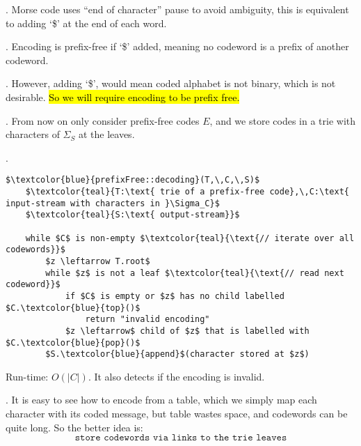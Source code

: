 \documentclass{article}
\begin{document}
\begin{examplee}[].
    Morse code uses ``end of character'' pause to avoid ambiguity, this is equivalent to adding `\$' at the end of each word. 
    \begin{result}[].
        Encoding is prefix-free if `\$' added, meaning no codeword is a prefix of another codeword. 
    \end{result}
    \begin{comm}[].
        However, adding `\$', would mean coded alphabet is not binary, which is not desirable. \hl{So we will require encoding to be prefix free.}
    \end{comm}
\end{examplee}

\begin{thmm}[].
    From now on only consider prefix-free codes $E$, and we store codes in a trie with characters of $\Sigma_S$ at the leaves. 
\end{thmm}

\begin{codes}[].
    \begin{lstlisting}[style=cppstyle, mathescape=true]
    $\textcolor{blue}{prefixFree::decoding}(T,\,C,\,S)$
    $\textcolor{teal}{T:\text{ trie of a prefix-free code},\,C:\text{ input-stream with characters in }\Sigma_C}$
    $\textcolor{teal}{S:\text{ output-stream}}$
    
    while $C$ is non-empty $\textcolor{teal}{\text{// iterate over all codewords}}$
        $z \leftarrow T.root$
        while $z$ is not a leaf $\textcolor{teal}{\text{// read next codeword}}$
            if $C$ is empty or $z$ has no child labelled $C.\textcolor{blue}{top}()$
                return "invalid encoding"
            $z \leftarrow$ child of $z$ that is labelled with $C.\textcolor{blue}{pop}()$
        $S.\textcolor{blue}{append}$(character stored at $z$)
    \end{lstlisting}
    Run-time: $O(|C|)$. It also detects if the encoding is invalid. 
\end{codes}

\begin{discovery}[].
    It is easy to see how to encode from a table, which we simply map each character with its coded message, but table wastes space, and codewords can be quite long. So the better idea is: 
    \[ \texttt{store codewords via links to the trie leaves} \]
\end{discovery}
\end{document}
